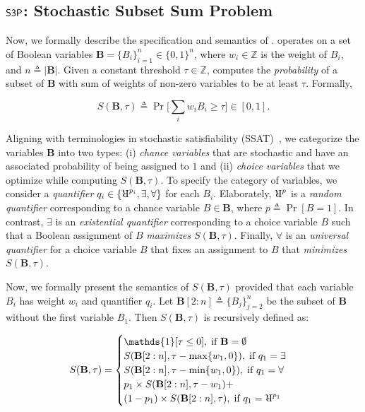 \subsection{$ \mathsf{S3P} $: Stochastic Subset Sum Problem}\label{fvgm_sec:stochastic_sum_set_sum}
Now, we formally describe the specification and semantics of {\stochastic}.
{\stochastic} operates on  a set of Boolean variables $ \mathbf{B} = \{B_i\}_{i=1}^{n} \in \{0,1\}^{n} $, where $ w_i \in \mathbb{Z} $ is the weight of $ B_i $, and $n \triangleq |\mathbf{B}|$. Given a constant threshold $ \tau \in \mathbb{Z} $, {\stochastic} computes the \textit{probability} of a subset of $ \mathbf{B} $ with sum of weights of non-zero variables to be at least $ \tau $. Formally,

\[S(\mathbf{B}, \tau) \triangleq \Pr\Big[\sum_{i} w_iB_i \ge \tau \Big] \in [0,1].\]

Aligning with terminologies in stochastic satisfiability (SSAT)~\cite{littman2001stochastic}, we categorize the variables $ \mathbf{B} $ into two types: (i) \textit{chance variables} that are stochastic and have an associated probability of being assigned to $ 1 $ and (ii) \textit{choice variables} that we  optimize while computing $ S(\mathbf{B}, \tau) $.  To specify the category of variables, we consider a \textit{quantifier} $ q_i \in \{\R^{p_i}, \exists, \forall\} $ for each $ B_i $. Elaborately, $ \R^{p} $ is a \textit{random quantifier} corresponding to a chance variable $ B \in \mathbf{B} $, where  $ p\triangleq \Pr[B = 1]$. In contrast, $ \exists $ is an \textit{existential quantifier} corresponding to a choice variable $ B $ such that a Boolean assignment of $ B $  \textit{maximizes}  $ S(\mathbf{B}, \tau) $. Finally, $ \forall $ is an \textit{universal quantifier} for a choice variable $ B $ that fixes an assignment to $ B $ that \textit{minimizes} $ S(\mathbf{B}, \tau) $. 
 
Now, we formally present the semantics of $ S(\mathbf{B}, \tau) $ provided that each variable $ B_i $ has weight $ w_i $ and quantifier $ q_i $. Let  $ \mathbf{B}[2:n] \triangleq \{B_j\}_{j=2}^{n} $ be the subset of $\mathbf{B}$ without the first variable $ B_1 $. Then $ S(\mathbf{B}, \tau) $ is recursively defined as:


\begin{align}\label{fvgm_eq:semantics_recurse}
  S(\mathbf{B},\tau) =
 \begin{cases}
 \mathds{1}[ \tau \le 0 ], \; \text{if } \textbf{B} = \emptyset \\
 S(\mathbf{B}[2:n],\tau - \max\{w_1, 0\}), \; \text{if } q_1 = \exists\\
 S(\mathbf{B}[2:n],\tau - \min\{w_1, 0\}), \; \text{if } q_1 = \forall\\
 p_1\times S(\mathbf{B}[2:n],\tau - w_1) +\\ (1-p_1)\times S(\mathbf{B}[2:n],\tau),\; \text{if } q_1 = \R^{p_1}
 \end{cases}
\end{align} 


